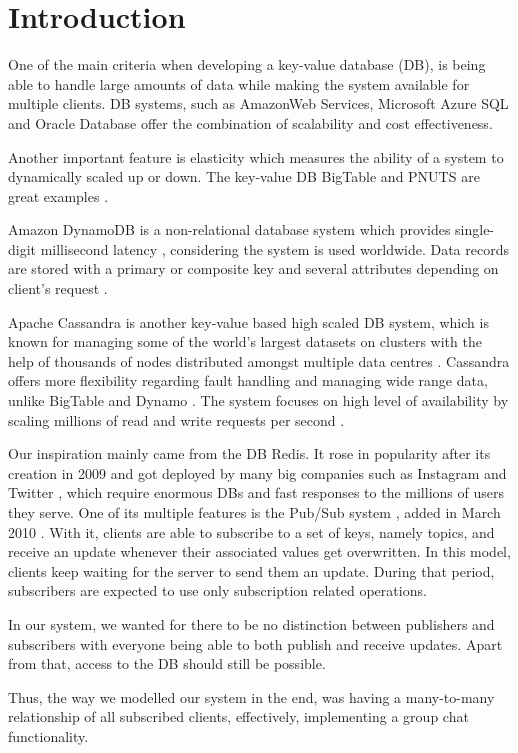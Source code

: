 \section{Introduction}
\label{sec:introduction}
One of the main criteria when developing a key-value database (DB), is being able to handle large amounts of data while making the system available for multiple clients. DB systems, such as AmazonWeb Services, Microsoft Azure SQL and Oracle Database offer the combination of scalability and cost effectiveness.

Another important feature is elasticity which measures the ability of a system to dynamically scaled up or down. The key-value DB BigTable and PNUTS are great examples \cite{agrawal2011database}.

Amazon DynamoDB is a non-relational database system which provides single-digit millisecond latency \cite{amazon}, considering the system is used worldwide. Data records are stored with a primary or composite key and several attributes depending on client's request \cite{kalid2017big}. 

Apache Cassandra is another key-value based high scaled \cite{abadi2012consistency} DB system, which is known for managing some of the world's largest datasets on clusters with the help of thousands of nodes distributed amongst multiple data centres \cite{chebotko2015big}. Cassandra offers more flexibility regarding fault handling and managing wide range data, unlike BigTable and Dynamo \cite{kalid2017big}. The system focuses on high level of availability by scaling millions of read and write requests per second \cite{chebotko2015big}.

Our inspiration mainly came from the DB Redis. It rose in popularity after its creation in 2009 and got deployed by many big companies such as Instagram \cite{krieger2011instagram} and Twitter \cite{yu2014twitter}, which require enormous DBs and fast responses to the millions of users they serve. One of its multiple features is the Pub/Sub system \cite{redis2020pubsub}, added in March 2010 \cite{sanfilippo2010pubsub}. With it, clients are able to subscribe to a set of keys, namely topics, and receive an update whenever their associated values get overwritten. In this model, clients keep waiting for the server to send them an update. During that period, subscribers are expected to use only subscription related operations.

In our system, we wanted for there to be no distinction between publishers and subscribers with everyone being able to both publish and receive updates. Apart from that, access to the DB should still be possible. 

Thus, the way we modelled our system in the end, was having a many-to-many relationship of all subscribed clients, effectively, implementing a group chat functionality.


